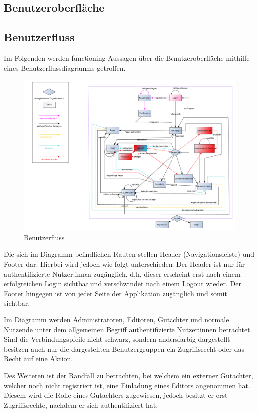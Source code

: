 \subsection{Benutzeroberfläche}

\subsection{Benutzerfluss}
Im Folgenden werden functioning Aussagen über die Benutzeroberfläche mithilfe eines Benutzerflussdiagramms getroffen.

\begin{figure}[H]
    \centering
    \includegraphics[width=\linewidth]{graphics/benutzerFlussyEd}
    \caption{Benutzerfluss}
\end{figure}

Die sich im Diagramm befindlichen Rauten stellen Header (Navigationsleiste) und Footer dar.
Hierbei wird jedoch wie folgt unterschieden: Der Header ist nur für authentifizierte Nutzer:innen zugänglich,
d.h. dieser erscheint erst nach einem erfolgreichen Login sichtbar und verschwindet nach einem Logout wieder.
Der Footer hingegen ist von jeder Seite der Applikation zugänglich und somit sichtbar.

Im Diagramm werden Administratoren, Editoren, Gutachter und normale Nutzende unter dem allgemeinen Begriff
authentifizierte Nutzer:innen betrachtet.
Sind die Verbindungspfeile nicht schwarz, sondern andersfarbig dargestellt besitzen auch nur die
dargestellten Benutzergruppen ein Zugriffsrecht oder das Recht auf eine Aktion.

Des Weiteren ist der Randfall zu betrachten, bei welchem ein externer Gutachter, welcher noch nicht registriert ist,
eine Einladung eines Editors angenommen hat.
Diesem wird die Rolle eines Gutachters zugewiesen, jedoch besitzt er erst Zugriffsrechte, nachdem er sich
authentifiziert hat.

